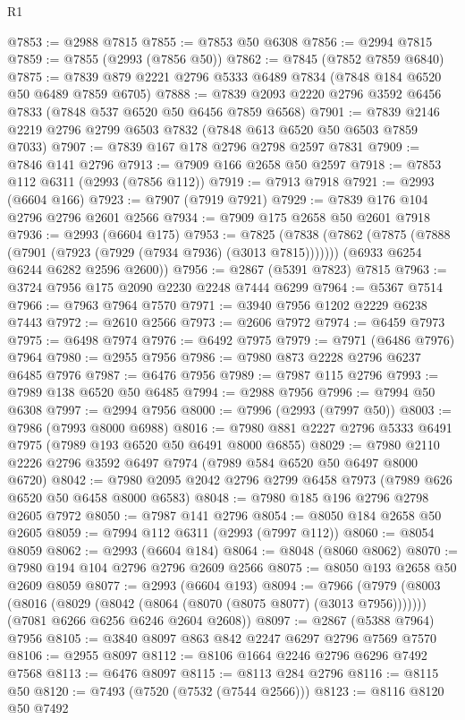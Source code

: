 \begin{lexlean}{R1}
\begin{coremodule}
@7853 := @2988 @7815
@7855 := @7853 @50 @6308
@7856 := @2994 @7815
@7859 := @7855 (@2993 (@7856 @50))
@7862 := @7845 (@7852 @7859 @6840)
@7875 := @7839 @879 @2221 @2796 @5333 @6489 @7834 (@7848 @184 @6520 @50 @6489 @7859 @6705)
@7888 := @7839 @2093 @2220 @2796 @3592 @6456 @7833 (@7848 @537 @6520 @50 @6456 @7859 @6568)
@7901 := @7839 @2146 @2219 @2796 @2799 @6503 @7832 (@7848 @613 @6520 @50 @6503 @7859 @7033)
@7907 := @7839 @167 @178 @2796 @2798 @2597 @7831
@7909 := @7846 @141 @2796
@7913 := @7909 @166 @2658 @50 @2597
@7918 := @7853 @112 @6311 (@2993 (@7856 @112))
@7919 := @7913 @7918
@7921 := @2993 (@6604 @166)
@7923 := @7907 (@7919 @7921)
@7929 := @7839 @176 @104 @2796 @2796 @2601 @2566
@7934 := @7909 @175 @2658 @50 @2601 @7918
@7936 := @2993 (@6604 @175)
@7953 := @7825
    (@7838
      (@7862 (@7875 (@7888 (@7901 (@7923 (@7929 (@7934 @7936) (@3013 @7815)))))))
      (@6933 @6254 @6244 @6282 @2596 @2600))
@7956 := @2867 (@5391 @7823) @7815
@7963 := @3724 @7956 @175 @2090 @2230 @2248 @7444 @6299
@7964 := @5367 @7514
@7966 := @7963 @7964 @7570
@7971 := @3940 @7956 @1202 @2229 @6238 @7443
@7972 := @2610 @2566
@7973 := @2606 @7972
@7974 := @6459 @7973
@7975 := @6498 @7974
@7976 := @6492 @7975
@7979 := @7971 (@6486 @7976) @7964
@7980 := @2955 @7956
@7986 := @7980 @873 @2228 @2796 @6237 @6485 @7976
@7987 := @6476 @7956
@7989 := @7987 @115 @2796
@7993 := @7989 @138 @6520 @50 @6485
@7994 := @2988 @7956
@7996 := @7994 @50 @6308
@7997 := @2994 @7956
@8000 := @7996 (@2993 (@7997 @50))
@8003 := @7986 (@7993 @8000 @6988)
@8016 := @7980 @881 @2227 @2796 @5333 @6491 @7975 (@7989 @193 @6520 @50 @6491 @8000 @6855)
@8029 := @7980 @2110 @2226 @2796 @3592 @6497 @7974 (@7989 @584 @6520 @50 @6497 @8000 @6720)
@8042 := @7980 @2095 @2042 @2796 @2799 @6458 @7973 (@7989 @626 @6520 @50 @6458 @8000 @6583)
@8048 := @7980 @185 @196 @2796 @2798 @2605 @7972
@8050 := @7987 @141 @2796
@8054 := @8050 @184 @2658 @50 @2605
@8059 := @7994 @112 @6311 (@2993 (@7997 @112))
@8060 := @8054 @8059
@8062 := @2993 (@6604 @184)
@8064 := @8048 (@8060 @8062)
@8070 := @7980 @194 @104 @2796 @2796 @2609 @2566
@8075 := @8050 @193 @2658 @50 @2609 @8059
@8077 := @2993 (@6604 @193)
@8094 := @7966
    (@7979
      (@8003 (@8016 (@8029 (@8042 (@8064 (@8070 (@8075 @8077) (@3013 @7956)))))))
      (@7081 @6266 @6256 @6246 @2604 @2608))
@8097 := @2867 (@5388 @7964) @7956
@8105 := @3840 @8097 @863 @842 @2247 @6297 @2796 @7569 @7570
@8106 := @2955 @8097
@8112 := @8106 @1664 @2246 @2796 @6296 @7492 @7568
@8113 := @6476 @8097
@8115 := @8113 @284 @2796
@8116 := @8115 @50
@8120 := @7493 (@7520 (@7532 (@7544 @2566)))
@8123 := @8116 @8120 @50 @7492

\end{coremodule}
\end{lexlean}
